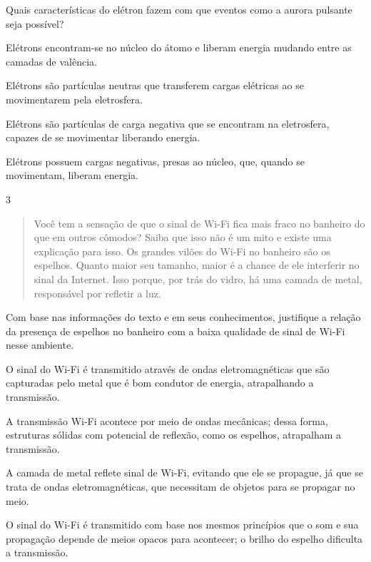 Quais características do elétron fazem com que eventos como a aurora
pulsante seja possível?

\begin{escolha}
\item
  Elétrons encontram-se no núcleo do átomo e liberam energia mudando entre as camadas de valência.
\item
  Elétrons são partículas neutras que transferem cargas elétricas ao se movimentarem pela eletrosfera.
\item
  Elétrons são partículas de carga negativa que se encontram na eletrosfera, capazes de se movimentar liberando energia.
\item
  Elétrons possuem cargas negativas, presas ao núcleo, que, quando se movimentam, liberam energia.
\end{escolha}


\num{3}

\begin{quote}  
Você tem a sensação de que o sinal de Wi-Fi fica mais fraco no
banheiro do que em outros cômodos? Saiba que isso não é um mito e
existe uma explicação para isso. Os grandes vilões do Wi-Fi no
banheiro são os espelhos. Quanto maior seu tamanho, maior é a chance
de ele interferir no sinal da Internet. Isso porque, por trás do
vidro, há uma camada de metal, responsável por refletir a luz.

\end{quote}

\pagebreak
Com base nas informações do texto e em seus conhecimentos, justifique a
relação da presença de espelhos no banheiro com a baixa qualidade de
sinal de Wi-Fi nesse ambiente.

\begin{escolha}
\item
  O sinal do Wi-Fi é transmitido através de ondas eletromagnéticas que
  são capturadas pelo metal que é bom condutor de energia, atrapalhando
  a transmissão.
\item
  A transmissão Wi-Fi acontece por meio de ondas mecânicas; dessa forma,
  estruturas sólidas com potencial de reflexão, como os espelhos,
  atrapalham a transmissão.
\item
  A camada de metal reflete sinal de Wi-Fi, evitando que ele se
  propague, já que se trata de ondas eletromagnéticas, que necessitam de
  objetos para se propagar no meio.
\item
  O sinal do Wi-Fi é transmitido com base nos mesmos princípios que o som
  e sua propagação depende de meios opacos para acontecer; o brilho do
  espelho dificulta a transmissão.
\end{escolha}


